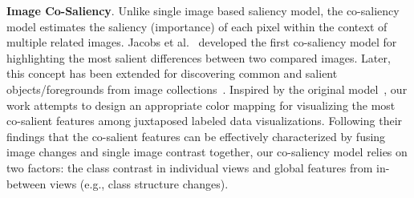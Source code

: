 %
\vspace{1.5mm}
\noindent\textbf{Image Co-Saliency}.
Unlike single image based saliency model, the co-saliency model estimates the saliency (importance) of each pixel within the context of multiple related images. Jacobs et al.~\cite{Jacobs10} developed the first co-saliency model for highlighting the most salient differences between two compared images.  Later, this concept has been extended for discovering common and salient objects/foregrounds from image collections~\cite{zhang2018review}. Inspired by the original model~\cite{Jacobs10}, our work attempts to design an appropriate color mapping for visualizing the most co-salient features among juxtaposed labeled data visualizations. Following their findings that the co-salient features can be effectively characterized by fusing image changes and single image contrast together, our co-saliency model relies on two factors: the class contrast in individual views  and global features from in-between views (e.g., class structure changes).

